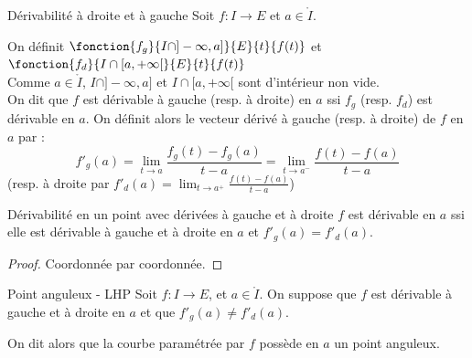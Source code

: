\begin{definition}{Dérivabilité à droite et à gauche}{}
    Soit $f : I \to E$ et $a \in \mathring I$. 

    \avspace On définit $\fonction{f_g}{I \cap ]-\infty, a]}{E}{t}{f(t)}$ et
    $\fonction{f_d}{I \cap [a, +\infty[}{E}{t}{f(t)}$ \\

    Comme $a \in \mathring I$, $I \cap ]-\infty, a]$ et $I \cap [a, +\infty[$ 
    sont d'intérieur non vide. \\

    On dit que $f$ est dérivable à gauche (resp. à droite) en $a$ ssi $f_g$ 
    (resp. $f_d$) est dérivable en $a$.
    On définit alors le vecteur dérivé à gauche (resp. à droite) de $f$ en $a$ par :
    \[f'_g(a) = \lim_{t \to a} \frac{f_g(t) - f_g(a)}{t-a} = \lim_{t \to a^-} \frac{f(t) - f(a)}{t-a}\]
    (resp. à droite par $f'_d(a) = \lim_{t \to a^+} \frac{f(t) - f(a)}{t-a}$)                                                    
\end{definition}

\begin{proposition}{Dérivabilité en un point avec dérivées à gauche et à droite}{}
    $f$ est dérivable en $a$ ssi elle est dérivable à gauche et à droite en $a$ et
    $f'_g(a) = f'_d(a)$. 
\end{proposition}

\begin{proof}
    Coordonnée par coordonnée.
\end{proof}

\begin{definition}{Point anguleux - LHP}{}
    Soit $f : I \to E$, et $a \in \mathring{I}$. 
    On suppose que $f$ est dérivable à gauche et à droite en $a$ et que 
    $f'_g(a) \neq f'_d(a)$.

    On dit alors que la courbe paramétrée par $f$ possède en $a$ un point anguleux.
\end{definition}


